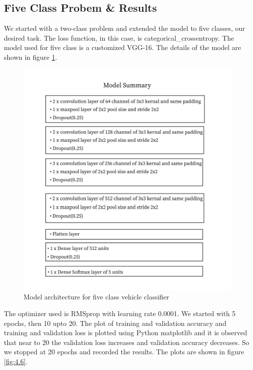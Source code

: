 \subsection{Five Class Probem \& Results}
We started with a two-class problem and extended the model to five classes, our desired task. The loss function, in this case, is categorical\_crossentropy.
The model used for five class is a customized VGG-16. The details of the
model are shown in figure \ref{model_summary}.
\begin{figure}[H]
    \centering
    \captionsetup{justification = centering}
    \includegraphics[scale = 0.85]{CHAPTERS/Chapter-4/Images/summary.jpg}
    \caption{Model architecture for five class vehicle classifier} 
    \label{model_summary}
\end{figure}
\noindent The optimizer used is RMSprop with
learning rate 0.0001. We started with 5 epochs, then 10 upto 20. The plot of training
and validation accuracy and training and validation loss is plotted using Python
matplotlib and it is observed that near to 20 the validation loss
increases and validation accuracy decreases. So we stopped at 20 epochs
and recorded the results. The plots are shown in
figure \ref{fig:4.6}.
